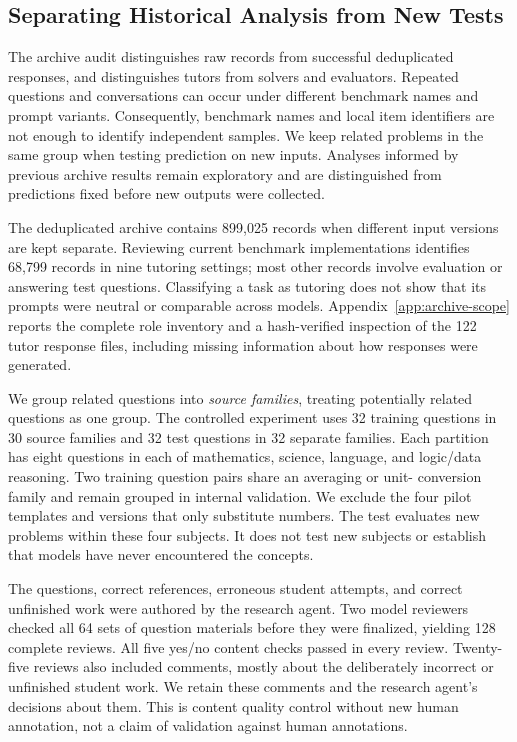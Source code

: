 \subsection{Separating Historical Analysis from New Tests}

The archive audit distinguishes raw records from successful deduplicated
responses, and distinguishes tutors from solvers and evaluators. Repeated
questions and conversations can occur under different benchmark names and
prompt variants. Consequently, benchmark names and local item identifiers are
not enough to identify independent samples. We keep related problems in
the same group when testing prediction on new inputs. Analyses informed by previous archive results remain
exploratory and are distinguished from predictions fixed before new outputs
were collected.

The deduplicated archive contains 899,025 records when different input
versions are kept separate. Reviewing current benchmark implementations
identifies 68,799 records in nine tutoring settings; most other records involve
evaluation or answering test questions. Classifying a task as tutoring does not show that its prompts were neutral
or comparable across models. Appendix~\ref{app:archive-scope} reports
the complete role inventory and a hash-verified inspection of the 122 tutor
response files, including missing information about how responses were generated.

We group related questions into \emph{source families}, treating potentially
related questions as one group. The controlled experiment uses 32 training
questions in 30 source families and 32 test questions in 32 separate families. Each
partition has eight questions in each of mathematics, science, language, and
logic/data reasoning. Two training question pairs share an averaging or unit-
conversion family and remain grouped in internal validation. We exclude the four pilot templates and versions that only substitute numbers.
The test evaluates new problems within these four subjects. It does not test
new subjects or establish that models have never encountered the concepts.

The questions, correct references, erroneous student attempts, and correct
unfinished work were authored by the research agent. Two model reviewers
checked all 64 sets of question materials before they were finalized,
yielding 128 complete reviews.
All five yes/no content checks passed in every review. Twenty-five reviews
also included comments, mostly about the deliberately incorrect or unfinished
student work. We retain these comments and the research agent's decisions
about them. This is content quality control without new
human annotation, not a claim of validation against human annotations.

